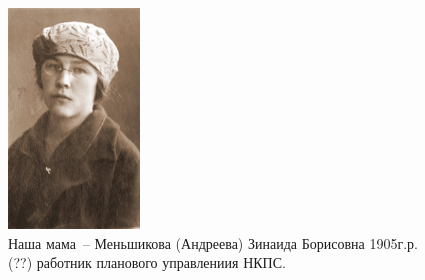 \documentclass[utf8x, 10pt]{G7-32} %
\begin{document}
\makeatletter
\renewcommand{\@oddfoot}{\hfill\thepage}
\renewcommand{\@evenfoot}{\thepage\hfill}

\makeatother

\frontmatter %


\thispagestyle{empty} 

\begin{figure}[h!]
    \begin{minipage}[h!]{50mm}
         \begin{center}
         \includegraphics[width=35mm]{inc/Menshekovy/11.jpg} 
         \end{center}
         \caption{Наша мама~-- Меньшикова (Андреева) Зинаида Борисовна 1905г.р. (??) работник планового управлениия НКПС.}
    \end{minipage}
    \hfill
   \begin{minipage}[h]{70mm}

\end{minipage}
\end{figure}
\end{document}
